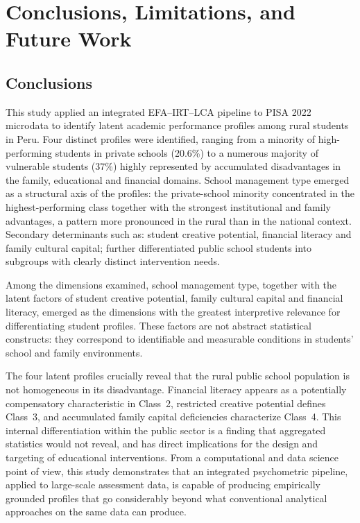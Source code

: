 \documentclass[runningheads]{llncs}
\begin{document}
\section{Conclusions, Limitations, and Future Work}
\label{sec:conclusions}

\subsection{Conclusions}

This study applied an integrated EFA--IRT--LCA pipeline to PISA
2022 microdata to identify latent academic performance profiles
among rural students in Peru. Four distinct profiles were
identified, ranging from a minority of high-performing students
in private schools (20.6\%) to a numerous majority of vulnerable
students (37\%) highly represented by accumulated disadvantages
in the family, educational and financial domains. School
management type emerged as a structural axis of the profiles: the
private-school minority concentrated in the highest-performing
class together with the strongest institutional and family
advantages, a pattern more pronounced in the rural than in the
national context. Secondary determinants such as: student
creative potential, financial literacy and family cultural
capital; further differentiated public school students into
subgroups with clearly distinct intervention needs.

Among the dimensions examined, school management type, together
with the latent factors of student creative potential, family
cultural capital and financial literacy, emerged as the
dimensions with the greatest interpretive relevance for
differentiating student profiles. These factors are not abstract
statistical constructs: they correspond to identifiable and
measurable conditions in students' school and family
environments.

The four latent profiles crucially reveal that the rural public
school population is not homogeneous in its disadvantage.
Financial literacy appears as a potentially compensatory
characteristic in Class~2, restricted creative potential defines
Class~3, and accumulated family capital deficiencies characterize
Class~4. This internal differentiation within the public sector
is a finding that aggregated statistics would not reveal, and has
direct implications for the design and targeting of educational
interventions. From a computational and data science point of
view, this study demonstrates that an integrated psychometric
pipeline, applied to large-scale assessment data, is capable of
producing empirically grounded profiles that go considerably
beyond what conventional analytical approaches on the same data
can produce.
\end{document}
